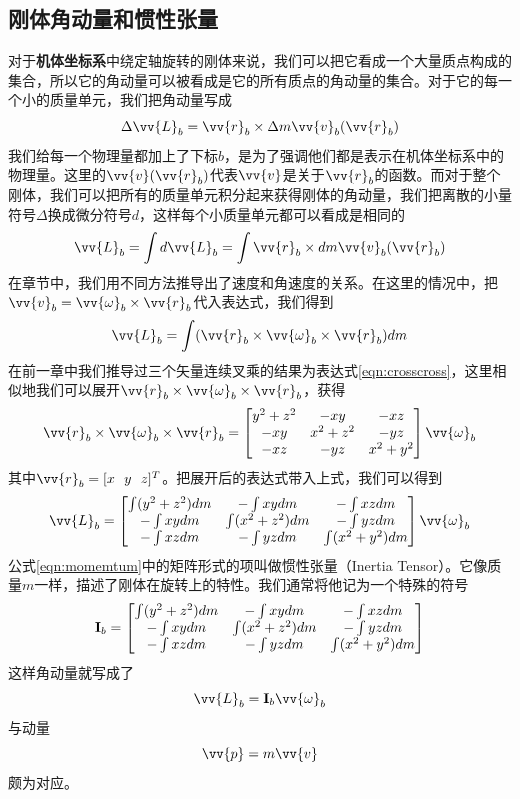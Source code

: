 \documentclass[11pt]{article}
\begin{document}
\subsection{刚体角动量和惯性张量}
对于\textbf{机体坐标系}中绕定轴旋转的刚体来说，我们可以把它看成一个大量质点构成的集合，所以它的角动量可以被看成是它的所有质点的角动量的集合。对于它的每一个小的质量单元，我们把角动量写成
$$
\Delta \vv{L}_b = \vv{r}_b \times \Delta m \vv{v}_b(\vv{r}_b)
$$
我们给每一个物理量都加上了下标$b$，是为了强调他们都是表示在机体坐标系中的物理量。这里的$\vv{v}(\vv{r}_b)$代表$\vv{v}$是关于$\vv{r}_b$的函数。而对于整个刚体，我们可以把所有的质量单元积分起来获得刚体的角动量，我们把离散的小量符号$\Delta$换成微分符号$d$，这样每个小质量单元都可以看成是相同的
$$
\vv{L}_b = \int d\vv{L}_b = \int \vv{r}_b \times dm \vv{v}_b(\vv{r}_b)
$$
在章节\label{sec:angular}中，我们用不同方法推导出了速度和角速度的关系。在这里的情况中，把$\vv{v}_b = \vv{\omega}_b\times\vv{r}_b$代入表达式，我们得到
\begin{equation}\label{eqn:ambody}
\vv{L}_b = \int (\vv{r}_b \times \vv{\omega}_b\times\vv{r}_b) dm
\end{equation}
在前一章中我们推导过三个矢量连续叉乘的结果为表达式\ref{eqn:crosscross}，这里相似地我们可以展开$\vv{r}_b \times \vv{\omega}_b\times\vv{r}_b$，获得
$$
\vv{r}_b \times \vv{\omega}_b \times\vv{r}_b = 
\begin{bmatrix}
y^2+z^2	&	-xy		&	-xz	\\
-xy		&	x^2+z^2	&	-yz	\\
-xz		&	-yz		&	x^2+y^2
\end{bmatrix}\vv{\omega}_b
$$
其中$\vv{r}_b = [x \ \ y \ \ z]^T$。把展开后的表达式带入上式，我们可以得到
\begin{equation}\label{eqn:momemtum}
\vv{L}_b = 
\begin{bmatrix}
\int (y^2+z^2) dm	&	-\int xy dm		&	-\int xz dm	\\
-\int xy dm		&	\int (x^2+z^2) dm	&	-\int yz dm	\\
-\int xz dm		&	-\int yz dm		&	\int (x^2+y^2) dm
\end{bmatrix}\vv{\omega}_b
\end{equation}
公式\ref{eqn:momemtum}中的矩阵形式的项叫做惯性张量（Inertia Tensor）。它像质量$m$一样，描述了刚体在旋转上的特性。我们通常将他记为一个特殊的符号
$$
{\bf I}_b = 
\begin{bmatrix}
\int (y^2+z^2) dm	&	-\int xy dm		&	-\int xz dm	\\
-\int xy dm		&	\int (x^2+z^2) dm	&	-\int yz dm	\\
-\int xz dm		&	-\int yz dm		&	\int (x^2+y^2) dm
\end{bmatrix}
$$
这样角动量就写成了
$$
\vv{L}_b = {\bf I}_b\vv{\omega}_b
$$
与动量
$$
\vv{p} = m\vv{v}
$$
颇为对应。
\end{document}
